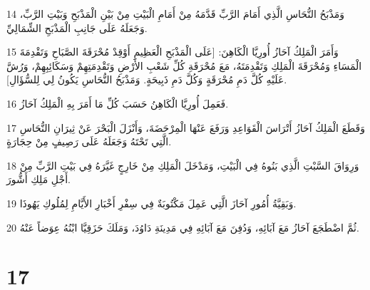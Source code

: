 \par 14 وَمَذْبَحُ النُّحَاسِ الَّذِي أَمَامَ الرَّبِّ قَدَّمَهُ مِنْ أَمَامِ الْبَيْتِ مِنْ بَيْنِ الْمَذْبَحِ وَبَيْتِ الرَّبِّ، وَجَعَلَهُ عَلَى جَانِبِ الْمَذْبَحِ الشِّمَالِيِّ.
\par 15 وَأَمَرَ الْمَلِكُ آحَازُ أُورِيَّا الْكَاهِنَ: [عَلَى الْمَذْبَحِ الْعَظِيمِ أَوْقِدْ مُحْرَقَةَ الصَّبَاحِ وَتَقْدِمَةَ الْمَسَاءِ وَمُحْرَقَةَ الْمَلِكِ وَتَقْدِمَتَهُ، مَعَ مُحْرَقَةِ كُلِّ شَعْبِ الأَرْضِ وَتَقْدِمَتِهِمْ وَسَكَائِبِهِمْ، وَرُشَّ عَلَيْهِ كُلَّ دَمِ مُحْرَقَةٍ وَكُلَّ دَمِ ذَبِيحَةٍ. وَمَذْبَحُ النُّحَاسِ يَكُونُ لِي لِلسُّؤَالِ].
\par 16 فَعَمِلَ أُورِيَّا الْكَاهِنُ حَسَبَ كُلِّ مَا أَمَرَ بِهِ الْمَلِكُ آحَازُ.
\par 17 وَقَطَعَ الْمَلِكُ آحَازُ أَتْرَاسَ الْقَوَاعِدِ وَرَفَعَ عَنْهَا الْمِرْحَضَةَ، وَأَنْزَلَ الْبَحْرَ عَنْ ثِيرَانِ النُّحَاسِ الَّتِي تَحْتَهُ وَجَعَلَهُ عَلَى رَصِيفٍ مِنْ حِجَارَةٍ.
\par 18 وَرِوَاقَ السَّبْتِ الَّذِي بَنُوهُ فِي الْبَيْتِ، وَمَدْخَلَ الْمَلِكِ مِنْ خَارِجٍ غَيَّرَهُ فِي بَيْتِ الرَّبِّ مِنْ أَجْلِ مَلِكِ أَشُّورَ.
\par 19 وَبَقِيَّةُ أُمُورِ آحَازَ الَّتِي عَمِلَ مَكْتُوبَةٌ فِي سِفْرِ أَخْبَارِ الأَيَّامِ لِمُلُوكِ يَهُوذَا.
\par 20 ثُمَّ اضْطَجَعَ آحَازُ مَعَ آبَائِهِ، وَدُفِنَ مَعَ آبَائِهِ فِي مَدِينَةِ دَاوُدَ، وَمَلَكَ حَزَقِيَّا ابْنُهُ عِوَضاً عَنْهُ.

\chapter{17}

